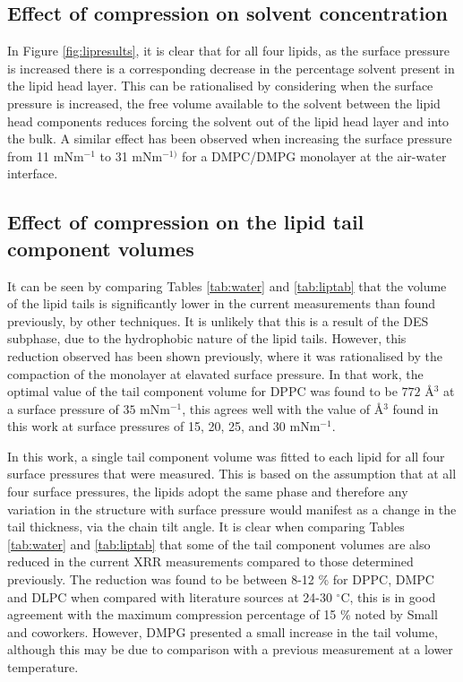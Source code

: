\documentclass[twoside,twocolumn,9pt]{article}
\begin{document}
\subsection{Effect of compression on solvent concentration}
In Figure \ref{fig:lipresults}, it is clear that for all four lipids, as the surface pressure is increased there is a corresponding decrease in the percentage solvent present in the lipid head layer. This can be rationalised by considering when the surface pressure is increased, the free volume available to the solvent between the lipid head components reduces forcing the solvent out of the lipid head layer and into the bulk. A similar effect has been observed when increasing the surface pressure from 11 mNm$^{-1}$ to 31 mNm$^{-1)}$ for a DMPC/DMPG monolayer at the air-water interface.\cite{Bayerl1990}

\subsection{Effect of compression on the lipid tail component volumes}
It can be seen by comparing Tables \ref{tab:water} and \ref{tab:liptab} that the volume of the lipid tails is significantly lower in the current measurements than found previously, by other techniques. It is unlikely that this is a result of the DES subphase, due to the hydrophobic nature of the lipid tails. However, this reduction observed has been shown previously,\cite{Campbell2018} where it was rationalised by the compaction of the monolayer at elavated surface pressure. In that work, the optimal value of the tail component volume for DPPC was found to be $772$ \AA${^3}$ at a surface pressure of $35$ mNm$^{-1}$, this agrees well with the value of  \AA$^3$ found in this work at surface pressures of 15, 20, 25, and 30 mNm$^{-1}$.

In this work, a single tail component volume was fitted to each lipid for all four surface pressures that were measured. This is based on the assumption that at all four surface pressures, the lipids adopt the same phase and therefore any variation in the structure with surface pressure would manifest as a change in the tail thickness, via the chain tilt angle. It is clear when comparing Tables \ref{tab:water} and \ref{tab:liptab} that some of the tail component volumes are also reduced in the current XRR measurements compared to those determined previously. The reduction was found to be between 8-12 \% for DPPC, DMPC and DLPC when compared with literature sources at 24-30 $^\circ$C, this is in good agreement with the maximum compression percentage of 15 \% noted by Small and coworkers.\cite{Small1984} However, DMPG presented a small increase in the tail volume, although this may be due to comparison with a previous measurement at a lower temperature.
\end{document}
